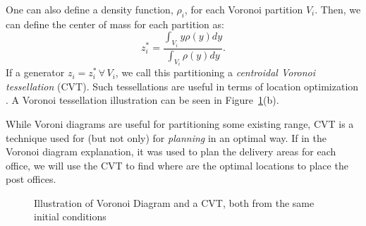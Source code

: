 \documentclass{iacas}
\begin{document}
One can also define a density function, $\rho_i$, for each Voronoi partition $V_{i}$. Then, we can define the center of mass for each partition as:
\begin{equation}
z_{i}^{*} = \frac{\int_{V_{i}}y\rho(y)dy}{\int_{V_{i}}\rho(y)dy}.
\end{equation}
If a generator $z_{i} = z_{i}^{*} \, \forall \,V_{i}$, we call this partitioning a \emph{centroidal Voronoi tessellation} (CVT). Such tessellations are useful in terms of location optimization \cite{Cortes2004,Du1999,Atinc2013}.
A Voronoi tessellation illustration can be seen in Figure~\ref{fig:Voronoi_tessellation_illustration}(b). 

While Voroni diagrams are useful for partitioning some existing range, CVT is a technique used for (but not only) for \textit{planning} in an optimal way. If in the Voronoi diagram explanation, it was used to plan the delivery areas for each office, we will use the CVT to find where are the optimal locations to place the post offices.

\begin{figure}
	\captionsetup[subfigure]{position=b}
	\centering
	\label{fig:voronoi:voronoi}
	\caption{Illustration of Voronoi Diagram and a CVT, both from the same initial conditions}
\label{fig:Voronoi_tessellation_illustration}
\end{figure}
\end{document}
